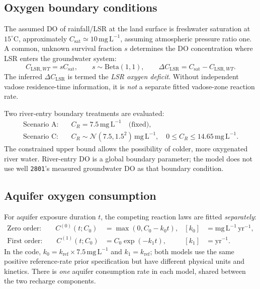 \documentclass[11pt,a4paper]{article}
\newcommand{\LSR}{\mathrm{LSR}}
\newcommand{\site}[1]{\texttt{#1}}
\newcommand{\mgL}{\mathrm{mg\,L^{-1}}}
\newcommand{\yr}{\mathrm{yr}}
\begin{document}
\subsection{Oxygen boundary conditions}
The assumed DO of rainfall/LSR at the land surface is freshwater saturation at \(15^{\circ}\mathrm C\), approximately \(C_{\mathrm{sat}}\simeq10\,\mgL\), assuming atmospheric pressure ratio one. A common, unknown survival fraction \(s\) determines the DO concentration where LSR enters the groundwater system:
\begin{equation}
 C_{\LSR,WT}=sC_{\mathrm{sat}},\qquad s\sim\mathrm{Beta}(1,1),\qquad
 \Delta C_{\LSR}=C_{\mathrm{sat}}-C_{\LSR,WT}.
 \label{eq:boundary}
\end{equation}
The inferred \(\Delta C_{\LSR}\) is termed the \emph{LSR oxygen deficit}. Without independent vadose residence-time information, it is \emph{not} a separate fitted vadose-zone reaction rate.

Two river-entry boundary treatments are evaluated:
\begin{align}
 \text{Scenario A:}&\quad C_R=7.5\,\mgL\quad\text{(fixed)},\\
 \text{Scenario C:}&\quad C_R\sim\mathcal N(7.5,1.5^2)\,\mgL,
 \quad0\leq C_R\leq14.65\,\mgL.
 \label{eq:riverprior}
\end{align}
The constrained upper bound allows the possibility of colder, more oxygenated river water. River-entry DO is a global boundary parameter; the model does not use well \site{2801}'s measured groundwater DO as that boundary condition.

\subsection{Aquifer oxygen consumption}
For aquifer exposure duration \(t\), the competing reaction laws are fitted \emph{separately}:
\begin{align}
 \text{Zero order:}\qquad C^{(0)}(t;C_0)&=\max(0,C_0-k_0t),
 & [k_0]&=\mgL\,\yr^{-1},\\
 \text{First order:}\qquad C^{(1)}(t;C_0)&=C_0\exp(-k_1t),
 & [k_1]&=\yr^{-1}.
 \label{eq:kinetics}
\end{align}
In the code, \(k_0=k_{\mathrm{ref}}\times7.5\,\mgL\) and \(k_1=k_{\mathrm{ref}}\); both models use the same positive reference-rate prior specification but have different physical units and kinetics. There is \emph{one} aquifer consumption rate in each model, shared between the two recharge components.
\end{document}
